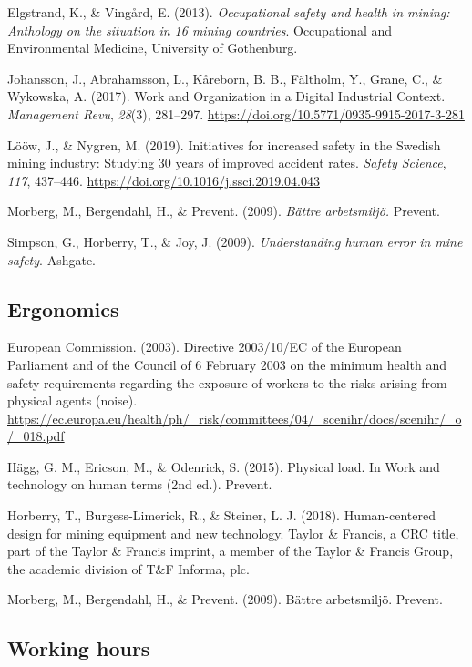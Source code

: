 \documentclass[
  12pt,
]{scrbook}
\begin{document}
Elgstrand, K., \& Vingård, E. (2013). \emph{Occupational safety and health in
mining: Anthology on the situation in 16 mining countries}. Occupational
and Environmental Medicine, University of Gothenburg.

Johansson, J., Abrahamsson, L., Kåreborn, B. B., Fältholm, Y., Grane,
C., \& Wykowska, A. (2017). Work and Organization in a Digital Industrial
Context. \emph{Management Revu}, \emph{28}(3), 281--297.
\url{https://doi.org/10.5771/0935-9915-2017-3-281}

Lööw, J., \& Nygren, M. (2019). Initiatives for increased safety in the
Swedish mining industry: Studying 30 years of improved accident rates.
\emph{Safety Science}, \emph{117}, 437--446.
\url{https://doi.org/10.1016/j.ssci.2019.04.043}

Morberg, M., Bergendahl, H., \& Prevent. (2009). \emph{Bättre arbetsmiljö.}
Prevent.

Simpson, G., Horberry, T., \& Joy, J. (2009). \emph{Understanding human error
in mine safety}. Ashgate.

\hypertarget{ergonomics-1}{%
\subsection*{Ergonomics}\label{ergonomics-1}}

European Commission. (2003). Directive 2003/10/EC of the European
Parliament and of the Council of 6 February 2003 on the minimum health
and safety requirements regarding the exposure of workers to the risks
arising from physical agents (noise).
\url{https://ec.europa.eu/health/ph/_risk/committees/04/_scenihr/docs/scenihr/_o/_018.pdf}

Hägg, G. M., Ericson, M., \& Odenrick, S. (2015). Physical load. In Work
and technology on human terms (2nd ed.). Prevent.

Horberry, T., Burgess-Limerick, R., \& Steiner, L. J. (2018).
Human-centered design for mining equipment and new technology. Taylor \&
Francis, a CRC title, part of the Taylor \& Francis imprint, a member of
the Taylor \& Francis Group, the academic division of T\&F Informa, plc.

Morberg, M., Bergendahl, H., \& Prevent. (2009). Bättre arbetsmiljö.
Prevent.

\hypertarget{working-hours-1}{%
\subsection*{Working hours}\label{working-hours-1}}
\end{document}
